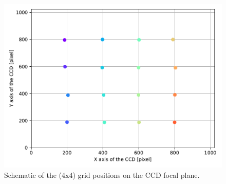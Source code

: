 \begin{figure}
    \centering
    \includegraphics[width=\columnwidth]{fig/ccd_grid_colors.pdf}
    \caption{Schematic of the (4x4) grid positions on the \SD CCD focal plane.}
    \label{fig:ccd_grid}
\end{figure}

